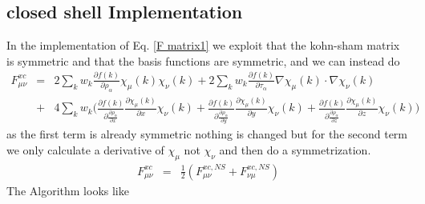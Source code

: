 \documentclass[preprint,preprintnumbers,amsmath,amssymb,11pt]{revtex4}
\begin{document}
\subsection{closed shell Implementation}
In the implementation of Eq. \eqref{F matrix1} we exploit that the kohn-sham matrix is symmetric and that the basis functions are symmetric, and we can instead do
\begin{eqnarray}\label{F matrix1}
F^{xc}_{\mu \nu} &=&  2 \sum_{k} w_{k} \frac{\partial f(k)}{\partial \rho_{\alpha}} \chi_{\mu}(k) \chi_{\nu}(k) + 2 \sum_{k} w_{k} \frac{\partial f(k)}{\partial \tau_{\alpha}} \nabla \chi_{\mu}(k) \cdot \nabla \chi_{\nu}(k)\\
&+& 4 \sum_{k} w_{k} \biggl( \frac{\partial f(k)}{\partial \frac{\partial \rho_{\alpha}}{\partial x}} \frac{\partial \chi_{\mu}(k) }{\partial x}  \chi_{\nu}(k)
+ \frac{\partial f(k)}{\partial \frac{\partial \rho_{\alpha}}{\partial y}} \frac{\partial \chi_{\mu}(k) }{\partial y}  \chi_{\nu}(k)
+ \frac{\partial f(k)}{\partial \frac{\partial \rho_{\alpha}}{\partial z}} \frac{\partial \chi_{\mu}(k)}{\partial z}  \chi_{\nu}(k) \biggr)
\end{eqnarray}
as the first term is already symmetric nothing is changed but for the second term we only calculate a derivative of $\chi_{\mu}$ not $\chi_{\nu}$ and then do a symmetrization.   
\begin{eqnarray}
F^{xc}_{\mu \nu} &=& \frac{1}{2}\left( F^{xc,NS}_{\mu \nu} + F^{xc,NS}_{\nu \mu}  \right)
\end{eqnarray}
The Algorithm looks like
\end{document}
